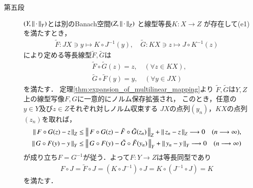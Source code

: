 \begin{prf}
\begin{description}
			\item[第五段]
				$(Y,\left\|\, \cdot\, \right\|_{Y})$とは別のBanach空間$(Z,\left\|\, \cdot\, \right\|_{Z})$
				と線型等長$K:X \longrightarrow Z$
				が存在して(e1)を満たすとき，
				\begin{align}
					\tilde{F}: J X \ni y \longmapsto K \circ J^{-1}(y),
					\quad \tilde{G}: K X \ni z \longmapsto J \circ K^{-1} (z)
				\end{align}
				により定める等長線型$\tilde{F},\tilde{G}$は
				\begin{align}
					&\tilde{F} \circ \tilde{G} (z) = z,
					\quad (\forall z \in K X), \\
					&\tilde{G} \circ \tilde{F} (y) = y,
					\quad (\forall y \in J X)
				\end{align}
				を満たす．
				定理\ref{thm:expansion_of_multilinear_mapping}より
				$\tilde{F},\tilde{G}$は$Y,Z$上の線型写像$F,G$に一意的にノルム保存拡張され，
				このとき，任意の$y \in Y$及び$z \in Z$それぞれ対しノルム収束する
				$J X$の点列$(y_n)$，$K X$の点列$(z_n)$を取れば，
				\begin{align}
					\left\|\, F \circ G (z) - z\, \right\|_{Z}
					\leq \left\|\, F \circ G (z) - \tilde{F} \circ \tilde{G} (z_n)\, \right\|_{Z}
						+ \left\|\, z_n - z\, \right\|_{Z}
					\longrightarrow 0 \quad (n \longrightarrow \infty), \\
					\left\|\, G \circ F (y) - y\, \right\|_{Y}
					\leq \left\|\, G \circ F (y) - \tilde{G} \circ \tilde{F} (y_n)\, \right\|_{Y}
						+ \left\|\, y_n - y\, \right\|_{Y}
					\longrightarrow 0 \quad (n \longrightarrow \infty)
				\end{align}
				が成り立ち$F = G^{-1}$が従う．よって$F:Y \longrightarrow Z$は等長同型であり
				\begin{align}
					F \circ J = \tilde{F} \circ J 
					= \left( K \circ J^{-1} \right) \circ J 
					= K \circ \left( J^{-1} \circ J \right)
					= K
				\end{align}
				を満たす．
			

\end{description}
\end{prf}
